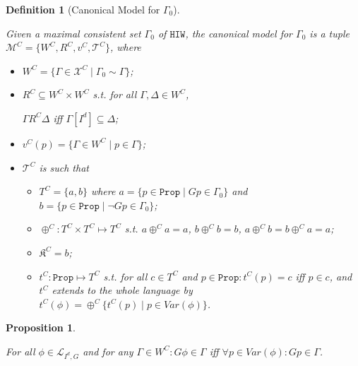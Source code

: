 \documentclass{article}
\newtheorem{defi}{Definition}
\newtheorem{prop}{Proposition}
\begin{document}
\begin{defi}[Canonical Model for $\Gamma_{0}$]
\label{canmodID}

Given a maximal consistent set $\Gamma_{0}$ of $\texttt{HIW}$, the canonical model for $\Gamma_{0}$ is a tuple $\mathcal{M}^{C} = \{W^{C}, R^{C}, v^{C}, \mathcal{T}^{C}\}$, where 

\begin{itemize}

\item $W^{C} = \{ \Gamma \in \mathcal{X}^{C} \mid \Gamma_{0} \sim \Gamma\}$;

\item $R^{C} \subseteq W^{C} \times W^{C}$ s.t. for all $\Gamma, \Delta \in W^{C}$, 

\begin{center}

$\Gamma R^{C} \Delta$ iff $\Gamma[I^{d}] \subseteq \Delta$;

\end{center}

\item $v^{C}(p) = \{\Gamma \in W^{C} \mid p \in \Gamma\}$;

\item $\mathcal{T}^{C}$ is such that

\begin{itemize}

\item $T^{C}= \{a, b\}$ where $a = \{p \in \mathtt{Prop} \mid G p \in \Gamma_{0}\}$ and $b = \{ p \in \mathtt{Prop} \mid \neg G p \in \Gamma_{0}\}$;

\item $\oplus^{C} : T^{C} \times T^{C} \mapsto T^{C}$ s.t. $a \oplus^{C} a = a$, $b \oplus^{C} b = b$, $a \oplus^{C} b = b \oplus^{C} a = a$;

\item $\mathfrak{K}^{C} = b$;

\item $t^{C}: \mathtt{Prop} \mapsto T^{C}$ s.t. for all $c \in T^{C}$ and $p \in \mathtt{Prop} : t^{C}(p) = c$ iff $p \in c$, and $t^{C}$ extends to the whole language by $t^{C}(\phi) = \oplus^{C}\{t^{C}(p) \mid p \in Var(\phi)\}$.

\end{itemize}

\end{itemize}

\end{defi}

\begin{prop}
\label{useful5}

For all $\phi \in \mathcal{L}_{I^{d}, G}$ and for any $\Gamma \in W^{C}: G \phi \in \Gamma$ iff $\forall p \in Var(\phi): G p \in \Gamma$.

\end{prop}
\end{document}

